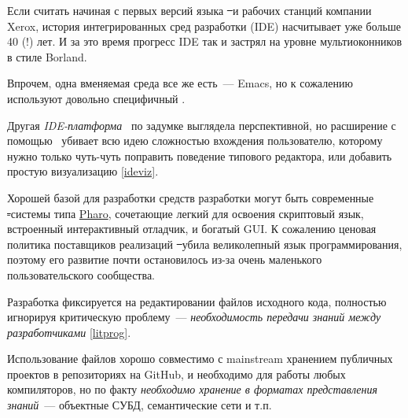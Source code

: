 \label{ide}\secdown


\clearpage
Если считать начиная с первых версий языка \st\ и рабочих станций компании
Xerox, история интегрированных сред разработки (IDE) насчитывает уже больше 40
(!) лет. И за это время прогресс IDE так и застрял на уровне мультиоконников
в стиле Borland.

Впрочем, одна вменяемая среда все же есть\ --- Emacs, но к
сожалению  используют довольно
специфичный \lisp.

Другая \emph{IDE-платформа} \eclipse\ по задумке выглядела перспективной, но
расширение с помощью \java\ убивает всю идею сложностью вхождения пользователю,
которому нужно только чуть-чуть поправить поведение типового редактора, или
добавить простую визуализацию \ref{ideviz}.

Хорошей базой для разработки средств разработки могут быть современные \st-системы типа
\href{https://pharo.org}{Pharo}, сочетающие легкий для освоения скриптовый язык,
встроенный интерактивный отладчик, и богатый GUI. К сожалению ценовая политика
поставщиков реализаций \st\ убила великолепный язык программирования, поэтому
его развитие почти остановилось из-за очень маленького пользовательского
сообщества.

\secdown


Разработка фиксируется на редактировании файлов исходного кода, полностью
игнорируя критическую проблему\ --- \emph{необходимость передачи знаний между
разработчиками} \ref{litprog}.

Использование файлов хорошо совместимо с mainstream хранением публичных проектов
в репозиториях на GitHub, и необходимо для работы любых компиляторов, но по
факту \emph{необходимо хранение в форматах представления знаний}\ --- объектные
СУБД, семантические сети и т.п.



\label{ideviz}


\secup



\secup
